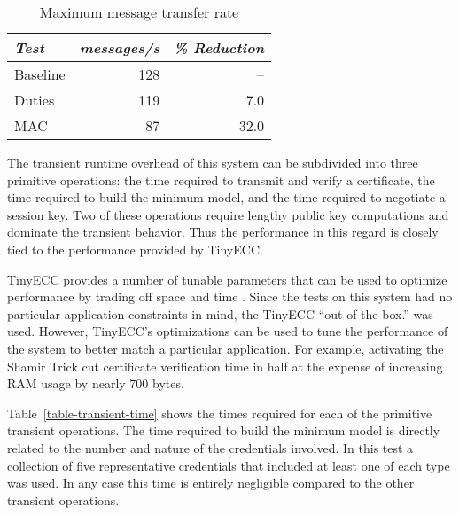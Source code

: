 \begin{table}[!t]
  \newcommand\T{\rule{0pt}{2.1ex}}
  \centering
  \caption{Maximum message transfer rate}
  {
  \begin{tabular}{|l|r|r|} \hline
    \textit{Test} \T & \textit{messages/s} & \textit{\% Reduction} \\
    \hline \hline

    Baseline \T & 128 &   -- \\ \hline 
    Duties   \T & 119 &  7.0 \\ \hline
    MAC      \T &  87 & 32.0 \\ \hline
  \end{tabular}
  }
  \label{table-steady-state}
\end{table}

The transient runtime overhead of this system can be subdivided into three primitive operations:
the time required to transmit and verify a certificate, the time required to build the minimum
model, and the time required to negotiate a session key. Two of these operations require lengthy
public key computations and dominate the transient behavior. Thus the performance in this regard
is closely tied to the performance provided by TinyECC.

TinyECC provides a number of tunable parameters that can be used to optimize performance by
trading off space and time \cite{Liu-Peng-TinyECC-2008}. Since the tests on this system had no
particular application constraints in mind, the TinyECC ``out of the box.'' was used. However,
TinyECC's optimizations can be used to tune the performance of the system to better match a
particular application. For example, activating the Shamir Trick cut certificate verification
time in half at the expense of increasing RAM usage by nearly 700 bytes.

Table~\ref{table-transient-time} shows the times required for each of the primitive transient
operations. The time required to build the minimum model is directly related to the number and
nature of the credentials involved. In this test a collection of five representative credentials
that included at least one of each type was used. In any case this time is entirely negligible
compared to the other transient operations.


